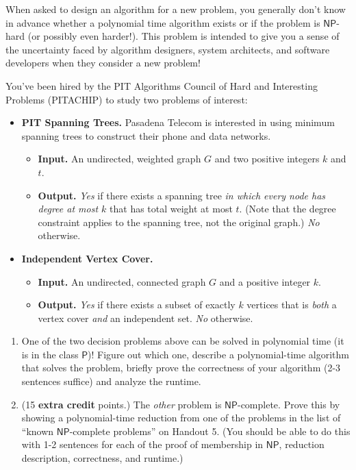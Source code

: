 \documentclass[12 pt, letterpaper]{hmcpset}
\newcommand{\NP}{$\mathsf{NP}$}
\renewcommand{\P}{$\mathsf{P}$}
\begin{document}
\begin{problem}
	When asked to design an algorithm for a new problem, you generally don't know in advance whether a polynomial time algorithm exists or if the problem is \NP-hard (or possibly even harder!).  This problem is intended to give you a sense of the uncertainty faced by algorithm designers, system architects, and software developers when they consider a new problem!

You've been hired by the PIT Algorithms Council of Hard and Interesting Problems (PITACHIP) to study two problems of interest:

\begin{itemize}
    \item \textbf{PIT Spanning Trees.}  Pasadena Telecom is interested in using minimum spanning trees to construct their phone and data networks. 
    \begin{itemize}
        \item \textbf{Input. } An undirected, weighted graph $G$ and two positive integers $k$ and $t$. 
        \item \textbf{Output. } \emph{Yes} if there exists a spanning tree \emph{in which every node has degree at most $k$} that has total weight at most $t$. (Note that the degree constraint applies to the spanning tree, not the original graph.) \emph{No} otherwise.
    \end{itemize}

    \item \textbf{Independent Vertex Cover.} 
    \begin{itemize}
        \item \textbf{Input. } An undirected, connected graph $G$ and a positive integer $k$. 
        \item \textbf{Output. } \emph{Yes} if there exists a subset of exactly $k$ vertices that is \emph{both} a vertex cover \emph{and} an independent set. \emph{No} otherwise.
    \end{itemize}
\end{itemize}

\begin{enumerate}
    \item One of the two decision problems above can be solved in polynomial time (it is in the class \P)! Figure out which one, describe a polynomial-time algorithm that solves the problem, briefly prove the correctness of your algorithm (2-3 sentences suffice) and analyze the runtime. 

    \item (15 \textbf{extra credit} points.) The \emph{other} problem is \NP-complete. Prove this by showing a polynomial-time reduction from one of the problems in the list of ``known \NP-complete problems'' on Handout 5. (You should be able to do this with 1-2 sentences for each of the proof of membership in \NP, reduction description, correctness, and runtime.)
\end{enumerate}
\end{problem}
\end{document}
